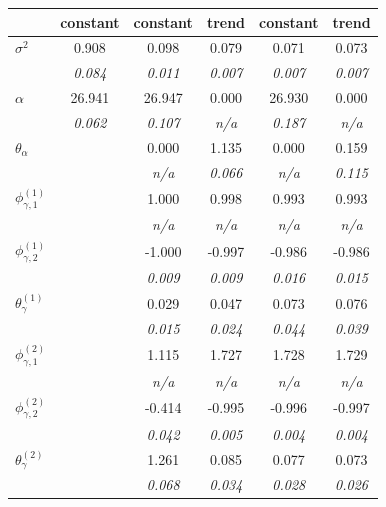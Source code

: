 \begin{table}[t!]
\centering
\footnotesize
\begin{tabular}{lccccc}
\toprule
 & constant & constant & trend & constant & trend \\
\midrule
$\sigma^2$ & 0.908 & 0.098 & 0.079 & 0.071 & 0.073 \\
 & {\footnotesize\textit{0.084}} & {\footnotesize\textit{0.011}} & {\footnotesize\textit{0.007}} & {\footnotesize\textit{0.007}} & {\footnotesize\textit{0.007}} \\
$\alpha$ & 26.941 & 26.947 & 0.000 & 26.930 & 0.000 \\
 & {\footnotesize\textit{0.062}} & {\footnotesize\textit{0.107}} & {\footnotesize\textit{n/a}} & {\footnotesize\textit{0.187}} & {\footnotesize\textit{n/a}} \\
$\theta_{\alpha}$ &  & 0.000 & 1.135 & 0.000 & 0.159 \\
 &  & {\footnotesize\textit{n/a}} & {\footnotesize\textit{0.066}} & {\footnotesize\textit{n/a}} & {\footnotesize\textit{0.115}} \\
$\phi_{\gamma,1}^{(1)}$ &  & 1.000 & 0.998 & 0.993 & 0.993 \\
 &  & {\footnotesize\textit{n/a}} & {\footnotesize\textit{n/a}} & {\footnotesize\textit{n/a}} & {\footnotesize\textit{n/a}} \\
$\phi_{\gamma,2}^{(1)}$ &  & -1.000 & -0.997 & -0.986 & -0.986 \\
 &  & {\footnotesize\textit{0.009}} & {\footnotesize\textit{0.009}} & {\footnotesize\textit{0.016}} & {\footnotesize\textit{0.015}} \\
$\theta_{\gamma}^{(1)}$ &  & 0.029 & 0.047 & 0.073 & 0.076 \\
 &  & {\footnotesize\textit{0.015}} & {\footnotesize\textit{0.024}} & {\footnotesize\textit{0.044}} & {\footnotesize\textit{0.039}} \\
$\phi_{\gamma,1}^{(2)}$ &  & 1.115 & 1.727 & 1.728 & 1.729 \\
 &  & {\footnotesize\textit{n/a}} & {\footnotesize\textit{n/a}} & {\footnotesize\textit{n/a}} & {\footnotesize\textit{n/a}} \\
$\phi_{\gamma,2}^{(2)}$ &  & -0.414 & -0.995 & -0.996 & -0.997 \\
 &  & {\footnotesize\textit{0.042}} & {\footnotesize\textit{0.005}} & {\footnotesize\textit{0.004}} & {\footnotesize\textit{0.004}} \\
$\theta_{\gamma}^{(2)}$ &  & 1.261 & 0.085 & 0.077 & 0.073 \\
 &  & {\footnotesize\textit{0.068}} & {\footnotesize\textit{0.034}} & {\footnotesize\textit{0.028}} & {\footnotesize\textit{0.026}} \\

\end{tabular}
\end{table}
